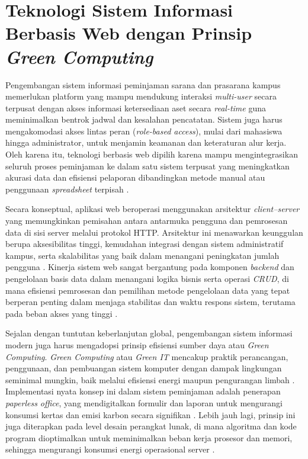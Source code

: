 \section{Teknologi Sistem Informasi Berbasis Web dengan Prinsip \textit{Green Computing}}
Pengembangan sistem informasi peminjaman sarana dan prasarana kampus memerlukan platform yang mampu mendukung interaksi \textit{multi-user} secara terpusat dengan akses informasi ketersediaan aset secara \textit{real-time} guna meminimalkan bentrok jadwal dan kesalahan pencatatan. Sistem juga harus mengakomodasi akses lintas peran (\textit{role-based access}), mulai dari mahasiswa hingga administrator, untuk menjamin keamanan dan keteraturan alur kerja. Oleh karena itu, teknologi berbasis web dipilih karena mampu mengintegrasikan seluruh proses peminjaman ke dalam satu sistem terpusat yang meningkatkan akurasi data dan efisiensi pelaporan dibandingkan metode manual atau penggunaan \textit{spreadsheet} terpisah \parencite{Herlambang2020, PutriNabella2025, Velasquez-Jimenez2025}.

Secara konseptual, aplikasi web beroperasi menggunakan arsitektur \textit{client–server} yang memungkinkan pemisahan antara antarmuka pengguna dan pemrosesan data di sisi server melalui protokol HTTP. Arsitektur ini menawarkan keunggulan berupa aksesibilitas tinggi, kemudahan integrasi dengan sistem administratif kampus, serta skalabilitas yang baik dalam menangani peningkatan jumlah pengguna \parencite{Purwati2022, Ramdany2024}. Kinerja sistem web sangat bergantung pada komponen \textit{backend} dan pengelolaan basis data dalam menangani logika bisnis serta operasi \textit{CRUD}, di mana efisiensi pemrosesan dan pemilihan metode pengelolaan data yang tepat berperan penting dalam menjaga stabilitas dan waktu respons sistem, terutama pada beban akses yang tinggi \parencite{Pratama2025}.

Sejalan dengan tuntutan keberlanjutan global, pengembangan sistem informasi modern juga harus mengadopsi prinsip efisiensi sumber daya atau \textit{Green Computing}. \textit{Green Computing} atau \textit{Green IT} mencakup praktik perancangan, penggunaan, dan pembuangan sistem komputer dengan dampak lingkungan seminimal mungkin, baik melalui efisiensi energi maupun pengurangan limbah \parencite{Murugesan2012}. Implementasi nyata konsep ini dalam sistem peminjaman adalah penerapan \textit{paperless office}, yang mendigitalkan formulir dan laporan untuk mengurangi konsumsi kertas dan emisi karbon secara signifikan \parencite{Kim2021}. Lebih jauh lagi, prinsip ini juga diterapkan pada level desain perangkat lunak, di mana algoritma dan kode program dioptimalkan untuk meminimalkan beban kerja prosesor dan memori, sehingga mengurangi konsumsi energi operasional server \parencite{Pratama2025}.

